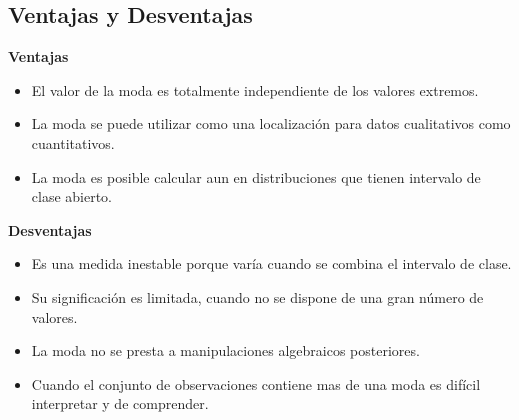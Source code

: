 \subsection{Ventajas y Desventajas}
\begin{multicols}{2}
\textbf{Ventajas}
\begin{itemize}
\item El valor de la moda es totalmente independiente de los valores extremos.
\item La moda se puede utilizar como una localización para datos cualitativos como cuantitativos.
\item La moda es posible calcular aun en distribuciones que tienen intervalo de clase abierto.
\end{itemize}
\columnbreak
\textbf{Desventajas}
\begin{itemize}
\item Es una medida inestable porque varía cuando se combina el intervalo de clase.
\item Su significación es limitada, cuando no se dispone de una gran número de valores.
\item La moda no se presta a manipulaciones algebraicos posteriores.
\item Cuando el conjunto de observaciones contiene mas de una moda es difícil interpretar y de comprender.
\end{itemize}
\end{multicols}